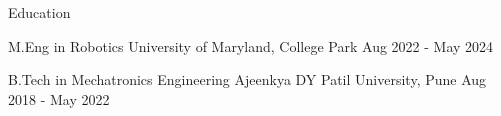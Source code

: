 \begin{section}{Education}

  \begin{school}
    {M.Eng in Robotics}
    {University of Maryland, College Park}
    {Aug 2022 - May 2024}


  \end{school}

  \begin{school}
    {B.Tech in Mechatronics Engineering}
    {Ajeenkya DY Patil University, Pune}
    {Aug 2018 - May 2022}


  \end{school}

\end{section}
